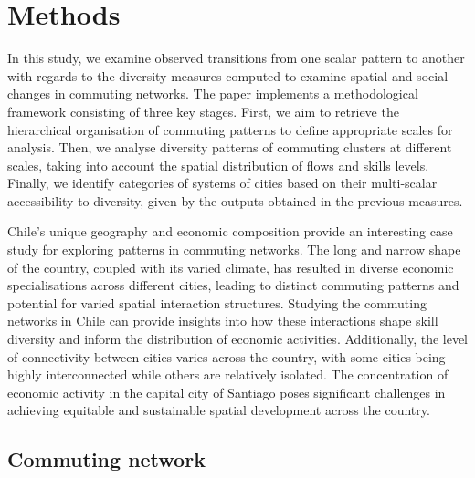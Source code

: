 \documentclass[11pt, a4paper]{article}
\begin{document}
\section{Methods}
 
In this study, we examine observed transitions from one scalar pattern to another with regards to the diversity measures computed to examine spatial and social changes in commuting networks. The paper implements a methodological framework consisting of three key stages. First, we aim to retrieve the hierarchical organisation of commuting patterns to define appropriate scales for analysis. Then, we analyse diversity patterns of commuting clusters at different scales, taking into account the spatial distribution of flows and skills levels. Finally, we identify categories of systems of cities based on their multi-scalar accessibility to diversity, given by the outputs obtained in the previous measures.

Chile's unique geography and economic composition provide an interesting case study for exploring patterns in commuting networks. The long and narrow shape of the country, coupled with its varied climate, has resulted in diverse economic specialisations across different cities, leading to distinct commuting patterns and potential for varied spatial interaction structures. Studying the commuting networks in Chile can provide insights into how these interactions shape skill diversity and inform the distribution of economic activities. Additionally, the level of connectivity between cities varies across the country, with some cities being highly interconnected while others are relatively isolated. The concentration of economic activity in the capital city of Santiago poses significant challenges in achieving equitable and sustainable spatial development across the country.

\subsection{Commuting network} 
\end{document}
